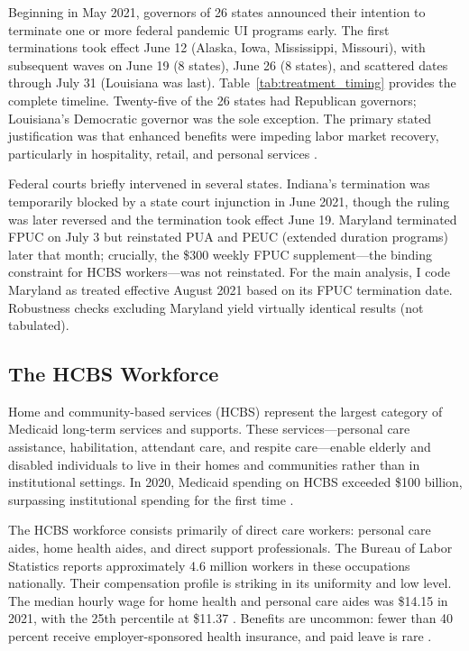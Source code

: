 \documentclass[12pt]{article}
\begin{document}
Beginning in May 2021, governors of 26 states announced their intention to terminate one or more federal pandemic UI programs early. The first terminations took effect June 12 (Alaska, Iowa, Mississippi, Missouri), with subsequent waves on June 19 (8 states), June 26 (8 states), and scattered dates through July 31 (Louisiana was last). Table~\ref{tab:treatment_timing} provides the complete timeline. Twenty-five of the 26 states had Republican governors; Louisiana's Democratic governor was the sole exception. The primary stated justification was that enhanced benefits were impeding labor market recovery, particularly in hospitality, retail, and personal services \citep{holzer2021}.

Federal courts briefly intervened in several states. Indiana's termination was temporarily blocked by a state court injunction in June 2021, though the ruling was later reversed and the termination took effect June 19. Maryland terminated FPUC on July 3 but reinstated PUA and PEUC (extended duration programs) later that month; crucially, the \$300 weekly FPUC supplement---the binding constraint for HCBS workers---was not reinstated. For the main analysis, I code Maryland as treated effective August 2021 based on its FPUC termination date. Robustness checks excluding Maryland yield virtually identical results (not tabulated).

\subsection{The HCBS Workforce}

Home and community-based services (HCBS) represent the largest category of Medicaid long-term services and supports. These services---personal care assistance, habilitation, attendant care, and respite care---enable elderly and disabled individuals to live in their homes and communities rather than in institutional settings. In 2020, Medicaid spending on HCBS exceeded \$100 billion, surpassing institutional spending for the first time \citep{macpac2022}.

The HCBS workforce consists primarily of direct care workers: personal care aides, home health aides, and direct support professionals. The Bureau of Labor Statistics reports approximately 4.6 million workers in these occupations nationally. Their compensation profile is striking in its uniformity and low level. The median hourly wage for home health and personal care aides was \$14.15 in 2021, with the 25th percentile at \$11.37 \citep{bls2022}. Benefits are uncommon: fewer than 40 percent receive employer-sponsored health insurance, and paid leave is rare \citep{phi2021}.
\end{document}
